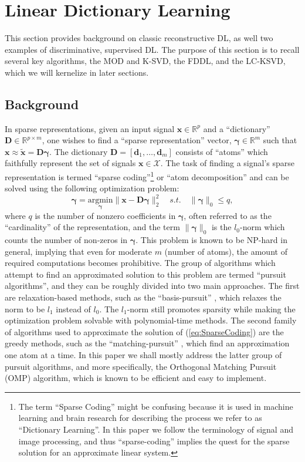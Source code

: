 \documentclass[journal]{IEEEtran}
\newcommand{\bD}{\mathbf{D}}
\newcommand{\bd}{\mathbf{d}}
\newcommand{\bx}{\mathbf{x}}
\newcommand{\cX}{\mathcal{X}}
\newcommand{\bgamma}{\boldsymbol{\gamma}}
\begin{document}
\section{Linear Dictionary Learning} \label{linearDL}

This section provides background on classic reconstructive DL, as well two examples of discriminative, supervised DL. The purpose of this section is to recall several key algorithms, the MOD and K-SVD, the FDDL, and the LC-KSVD, which we will kernelize in later sections.

\subsection{Background} \label{SS:Background}

In sparse representations, given an input signal $\bx \in \mathbb{R}^p$ and a ``dictionary'' $\bD \in \mathbb{R}^{p \times m}$, one wishes to find a ``sparse representation'' vector, $\bgamma \in \mathbb{R}^m$ such that $\bx \approx \tilde{\bx} = \bD \bgamma$. The dictionary $\bD = \left[\bd_1,\ldots,\bd_m\right]$ consists of ``atoms'' which faithfully represent the set of signals $\bx \in \cX$. The task of finding a signal's sparse representation is termed ``sparse coding''\footnote{The term ``Sparse Coding'' might be confusing because it is used in machine learning and brain research for describing the process we refer to as ``Dictionary Learning''. In this paper we follow the terminology of signal and image processing, and thus ``sparse-coding'' implies the quest for the sparse solution for an approximate linear system.} or ``atom decomposition'' and can be solved using the following optimization problem:
\begin{equation}\label{eq:SparseCoding}
    \bgamma = \underset{\bgamma}{\text{argmin}} \| \bx - \bD \bgamma \|_2^2 \quad s.t. \quad \| \bgamma \|_0 \leq \mathit{q},
\end{equation}
where $q$ is the number of nonzero coefficients in $\bgamma$, often referred to as the ``cardinality'' of the representation, and the term $\|\bgamma\|_0$ is the $l_0$-norm which counts the number of non-zeros in $\bgamma$. This problem is known to be NP-hard in general, implying that even for moderate $m$ (number of atoms), the amount of required computations becomes prohibitive. The group of algorithms which attempt to find an approximated solution to this problem are termed ``pursuit algorithms'', and they can be roughly divided into two main approaches.
The first are relaxation-based methods, such as the ``basis-pursuit'' \cite{basePursuit}, which relaxes the norm to be $l_1$ instead of $l_0$. The $l_1$-norm still promotes sparsity while making the optimization problem solvable with polynomial-time methods. The second family of algorithms used to approximate the solution of (\ref{eq:SparseCoding}) are the greedy methods, such as the ``matching-pursuit'' \cite{matchPursuit}, which find an approximation one atom at a time. In this paper we shall mostly address the latter group of pursuit algorithms, and more specifically, the Orthogonal Matching Pursuit (OMP) \cite{OMP} algorithm, which is known to be efficient and easy to implement.
\end{document}
